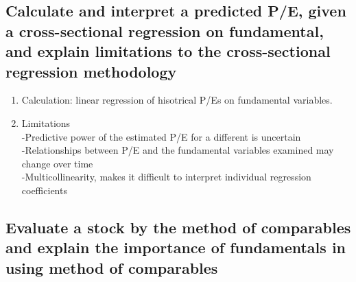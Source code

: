 \documentclass{article}
\newcommand{\be}{\begin{enumerate}}
\newcommand{\ee}{\end{enumerate}}
\begin{document}
\subsection{Calculate and interpret a predicted P/E, given a cross-sectional
regression on fundamental, and explain limitations to the cross-sectional regression
methodology}
\be
    \item Calculation: linear regression of hisotrical P/Es on fundamental variables.
    \item Limitations
        \\-Predictive power of the estimated P/E for a different is uncertain
        \\-Relationships between P/E and the fundamental variables examined may
        change over time
        \\-Multicollinearity, makes it difficult to interpret individual regression coefficients
\ee
\subsection{Evaluate a stock by the method of comparables and explain the importance of fundamentals
in using method of comparables}
\end{document}
